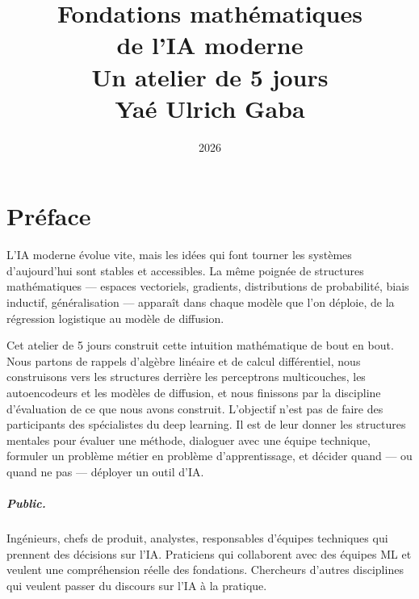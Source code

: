 \documentclass[12pt,a4paper,twoside]{book}
\title{
  \vspace{-2cm}
  {\Huge\bfseries Fondations mathématiques}\\[6pt]
  {\Huge\bfseries de l'IA moderne}\\[12pt]
  {\LARGE Un atelier de 5 jours}\\[24pt]
  {\normalsize Yaé Ulrich Gaba}
}
\date{2026}
\author{}
\begin{document}
\frontmatter
\maketitle

\tableofcontents
\newpage

\chapter*{Préface}

L'IA moderne évolue vite, mais les idées qui font tourner les systèmes d'aujourd'hui sont stables et accessibles. La même poignée de structures mathématiques --- espaces vectoriels, gradients, distributions de probabilité, biais inductif, généralisation --- apparaît dans chaque modèle que l'on déploie, de la régression logistique au modèle de diffusion.

Cet atelier de 5 jours construit cette intuition mathématique de bout en bout. Nous partons de rappels d'algèbre linéaire et de calcul différentiel, nous construisons vers les structures derrière les perceptrons multicouches, les autoencodeurs et les modèles de diffusion, et nous finissons par la discipline d'évaluation de ce que nous avons construit. L'objectif n'est pas de faire des participants des spécialistes du deep learning. Il est de leur donner les structures mentales pour évaluer une méthode, dialoguer avec une équipe technique, formuler un problème métier en problème d'apprentissage, et décider quand --- ou quand ne pas --- déployer un outil d'IA.

\paragraph{Public.} Ingénieurs, chefs de produit, analystes, responsables d'équipes techniques qui prennent des décisions sur l'IA. Praticiens qui collaborent avec des équipes ML et veulent une compréhension réelle des fondations. Chercheurs d'autres disciplines qui veulent passer du discours sur l'IA à la pratique.
\end{document}
